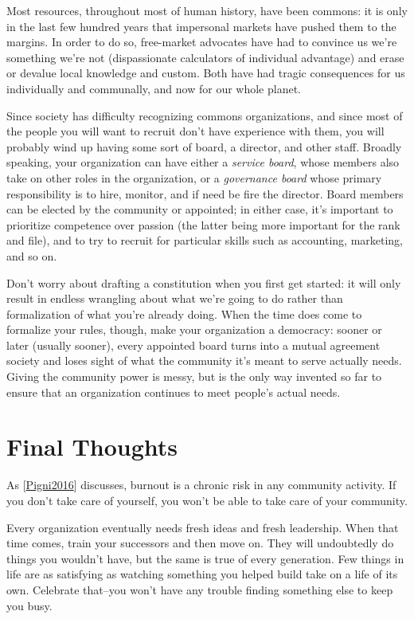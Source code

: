 \documentclass[10pt,statementpaper]{memoir}
\begin{document}
Most resources, throughout most of human history, have been commons: it
is only in the last few hundred years that impersonal markets have
pushed them to the margins. In order to do so, free-market advocates
have had to convince us we're something we're not (dispassionate
calculators of individual advantage) and erase or devalue local
knowledge and custom. Both have had tragic consequences for us
individually and communally, and now for our whole planet.

Since society has difficulty recognizing commons organizations, and
since most of the people you will want to recruit don't have experience
with them, you will probably wind up having some sort of board, a
director, and other staff. Broadly speaking, your organization can have
either a \emph{service board}, whose members also take on other roles in
the organization, or a \emph{governance board} whose primary
responsibility is to hire, monitor, and if need be fire the director.
Board members can be elected by the community or appointed; in either
case, it's important to prioritize competence over passion (the latter
being more important for the rank and file), and to try to recruit for
particular skills such as accounting, marketing, and so on.

Don't worry about drafting a constitution when you first get started: it
will only result in endless wrangling about what we're going to do
rather than formalization of what you're already doing. When the time
does come to formalize your rules, though, make your organization a
democracy: sooner or later (usually sooner), every appointed board turns
into a mutual agreement society and loses sight of what the community
it's meant to serve actually needs. Giving the community power is messy,
but is the only way invented so far to ensure that an organization
continues to meet people's actual needs.

\section{Final Thoughts}\label{final-thoughts}

As {[}\href{biblio.html\#pigni-idealists}{Pigni2016}{]} discusses,
burnout is a chronic risk in any community activity. If you don't take
care of yourself, you won't be able to take care of your community.

Every organization eventually needs fresh ideas and fresh leadership.
When that time comes, train your successors and then move on. They will
undoubtedly do things you wouldn't have, but the same is true of every
generation. Few things in life are as satisfying as watching something
you helped build take on a life of its own. Celebrate that--you won't
have any trouble finding something else to keep you busy.
\end{document}
